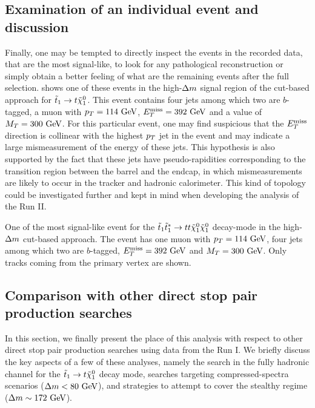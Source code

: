     \subsection{Examination of an individual event and discussion}

    Finally, one may be tempted to directly inspect the events in the recorded data, that are the
    most signal-like, to look for any pathological reconstruction or simply obtain a
    better feeling of what are the remaining events after the full selection. 
    shows one of these events in the high-$\Delta m$ signal region of the cut-based approach
    for $\tilde{t}_1 \rightarrow t \tilde{\chi}_1^0$. This event contains four jets among which
    two are $b$-tagged, a muon with $p_T = 114~\text{GeV}$, $E_T^\text{miss} = 392~\text{GeV}$ and a value of $M_T =
    300~\text{GeV}$. For this particular event, one may find suspicious that the $E_T^\text{miss}$ direction
    is collinear with the highest $p_T$ jet in the event and may indicate a large mismeasurement
    of the energy of these jets. This hypothesis is also supported by the fact that these
    jets have pseudo-rapidities corresponding to the transition region between the barrel
    and the endcap, in which mismeasurements are likely to occur in the tracker and hadronic
    calorimeter. This kind of topology could be investigated further and kept in mind when
    developing the analysis of the Run II.

    {One of the most signal-like event for the $\tilde{t}_1 \tilde{t}_1^{*} \rightarrow t t \tilde{\chi}_1^0 \tilde{\chi}_1^0$
    decay-mode in the high-$\Delta m$ cut-based approach. The event has one muon with
    $p_T = 114~\text{GeV}$, four jets among which two are $b$-tagged, $E_T^\text{miss} = 392~\text{GeV}$ and $M_T = 300 ~\text{GeV}$.
    Only tracks coming from the primary vertex are shown.}

    \newpage

    \subsection{Comparison with other direct stop pair production searches}

    In this section, we finally present the place of this analysis with respect to other
    direct stop pair production searches using data from the Run I. We briefly discuss the
    key aspects of a few of these analyses, namely the search in the fully hadronic channel
    for the $\tilde{t}_1 \rightarrow t \tilde{\chi}_1^0$ decay mode, searches targeting
    compressed-spectra scenarios ($\Delta m < 80~\text{GeV}$), and strategies to attempt to cover
    the stealthy regime ($\Delta m \sim 172~\text{GeV}$).

